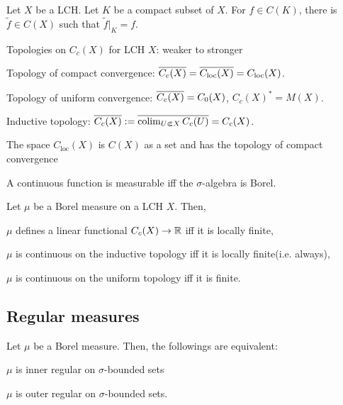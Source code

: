 \documentclass{../exp}
\begin{document}
\begin{lem}
Let $X$ be a LCH.
Let $K$ be a compact subset of $X$.
For $f\in C(K)$, there is $\tilde f\in C(X)$ such that $\tilde f|_K=f$.
\end{lem}


Topologies on $C_c(X)$ for LCH $X$: weaker to stronger
\begin{cond}
\item Topology of compact convergence: $\overline{C_c(X)}=\overline{C_{\mathrm{loc}}(X)}=C_{\mathrm{loc}}(X)$.
\item Topology of uniform convergence: $\overline{C_c(X)}=C_0(X)$, $C_c(X)^*=M(X)$.
\item Inductive topology: $\overline{C_c(X)}:=\overline{\operatorname*{colim}_{U\Subset X}C_c(U)}=C_c(X)$.
\end{cond}
The space $C_{\mathrm{loc}}(X)$ is $C(X)$ as a set and has the topology of compact convergence


\begin{prop}
A continuous function is measurable iff the $\sigma$-algebra is Borel.
\end{prop}
\begin{prop}
Let $\mu$ be a Borel measure on a LCH $X$.
Then,
\begin{cond}
\item $\mu$ defines a linear functional $C_c(X)\to\R$ iff it is locally finite,
\item $\mu$ is continuous on the inductive topology iff it is locally finite(i.e. always),
\item $\mu$ is continuous on the uniform topology iff it is finite.
\end{cond}
\end{prop}

\subsection{Regular measures}

\begin{thm}
Let $\mu$ be a Borel measure.
Then, the followings are equivalent:
\begin{cond}
\item$\mu$ is inner regular on $\sigma$-bounded sets
\item $\mu$ is outer regular on $\sigma$-bounded sets.
\end{cond}
\end{thm}
\end{document}
